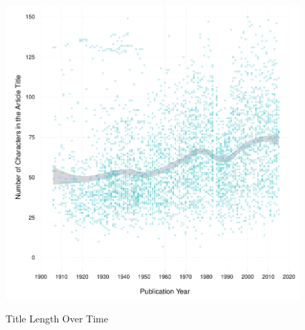 \documentclass[11pt]{article}
\begin{document}
\begin{figure}[htbp]
\centering
\caption{Title Length Over Time}
\includegraphics[scale=.85]{../figs/title_len_over_time.pdf}
\label{fig:fulltext}
\end{figure}

\clearpage


\end{document}
